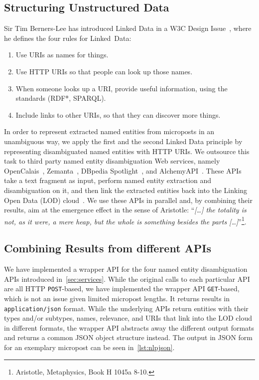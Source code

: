 \documentclass{iosart2c}
\begin{document}
\subsection{Structuring Unstructured Data}    \label{sec:services}
Sir Tim Berners-Lee has introduced Linked Data in a W3C Design Issue~\cite{TimBL:LinkedData}, where he defines the four rules for Linked~Data:
\begin{enumerate}
\item Use URIs as names for things.
\item Use HTTP URIs so that people can look up those names.
\item When someone looks up a URI, provide useful information, using the standards (RDF*, SPARQL).
\item Include links to other URIs, so that they can discover more things.
\end{enumerate}
In order to represent extracted named entities from microposts in an unambiguous way, we apply the first and the second Linked Data principle by representing disambiguated named entities with HTTP URIs.
We outsource this task to third party named entity disambiguation Web services, namely OpenCalais~\cite{OpenCalais}, Zemanta~\cite{Zemanta}, DBpedia Spotlight~\cite{Spotlight}, and AlchemyAPI~\cite{AlchemyApi}.
These APIs take a text fragment as input, perform named entity extraction and disambiguation on it, and then link the extracted entities back into the Linking Open Data (LOD) cloud~\cite{LODcloud}.
We use these APIs in parallel and, by combining their results, aim at the emergence effect in the sense of Aristotle: ``\emph{[\ldots] the totality is not, as it were, a mere heap, but the whole is something besides the parts [\ldots]}''\footnote{Aristotle, Metaphysics, Book H 1045a 8-10.}. 

\subsection{Combining Results from different APIs}                     \label{sec:consolidation-nlp}
We have implemented a wrapper API for the four named entity disambiguation APIs introduced in~\autoref{sec:services}.
While the original calls to each particular API are all HTTP \texttt{POST}-based, we have implemented the wrapper API \texttt{GET}-based, which is not an issue given limited micropost lengths.
It returns results in \texttt{application/json} format.
While the underlying APIs return entities with their types and/or subtypes, names, relevance, and URIs that link into the LOD cloud in different formats, the wrapper API abstracts away the different output formats and returns a common JSON object structure instead.
The output in JSON form for an exemplary micropost can be seen in~\autoref{lst:nlpjson}.
\end{document}
